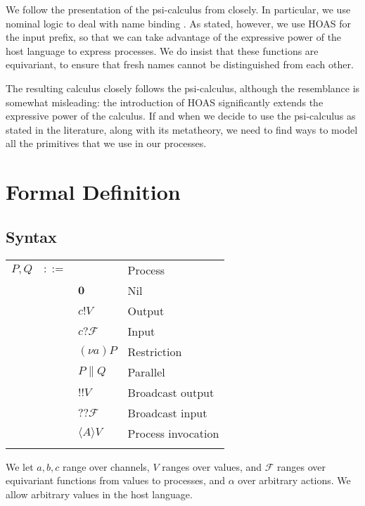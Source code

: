 \documentclass{article}
\newcommand{\pOut}{{!}}
\newcommand{\bOut}{{!\!!}}
\newcommand{\pIn}{{?}}
\newcommand{\bIn}{{?\!?}}
\newcommand{\new}[2]{(\nu\!#1) #2}
\newcommand{\nil}{\mathbf{0}}
\newcommand{\invoke}[1]{\langle #1 \rangle}
\newcommand{\psicalculus}{psi-calculus\xspace}
\begin{document}
We follow the presentation of the psi-calculus from \cite{Borgström2015}
closely. In particular, we use nominal logic to deal with name binding
\cite{Pitts2001,DBLP:journals/corr/abs-0809-3960}. As stated, however, we use
HOAS for the input prefix, so that we can take advantage of the expressive power
of the host language to express processes. We do insist that these functions are
equivariant, to ensure that fresh names cannot be distinguished from each other.

The resulting calculus closely follows the \psicalculus, although the
resemblance is somewhat misleading: the introduction of HOAS significantly
extends the expressive power of the calculus. If and when we decide to use the
\psicalculus as stated in the literature, along with its metatheory, we need to
find ways to model all the primitives that we use in our processes.

\section{Formal Definition}

\subsection{Syntax}

\begin{tabular}{llll}
$P, Q$ & $::=$ && Process \\
  && $\nil$               & Nil                \\
  && $c \pOut V$          & Output             \\
  && $c \pIn \mathcal{F}$ & Input              \\
  && $\new{a}{P}$         & Restriction        \\
  && $P \parallel Q$      & Parallel           \\
  && $\bOut V$            & Broadcast output   \\
  && $\bIn \mathcal{F}$   & Broadcast input    \\
  && $\invoke{A} V$       & Process invocation \\
\\
\end{tabular}

We let $a, b, c$ range over channels, $V$ ranges over values, and $\mathcal{F}$
ranges over equivariant functions from values to processes, and $\alpha$ over
arbitrary actions. We allow arbitrary values in the host language.
\end{document}

